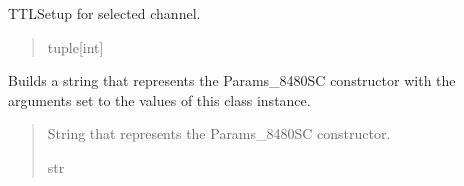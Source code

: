 \documentclass[letterpaper,10pt,english]{sphinxmanual}
\begin{document}
\begin{fulllineitems}
\begin{fulllineitems}
\begin{quote}
\begin{description}
\end{description}\end{quote}

\end{fulllineitems}


\begin{fulllineitems}
\label{\detokenize{PodApi.Parameters:PodApi.Parameters.Params8480SC.Params8480SC.ttlSetup}}
\pysigstartsignatures
{}
\pysigstopsignatures
\sphinxAtStartPar
TTL\sphinxhyphen{}Setup for selected channel.
\begin{quote}\begin{description}
\sphinxAtStartPar
tuple{[}int{]}

\end{description}\end{quote}

\end{fulllineitems}


\begin{fulllineitems}
\label{\detokenize{PodApi.Parameters:PodApi.Parameters.Params8480SC.Params8480SC.GetInit}}
\pysigstartsignatures
{}
\pysigstopsignatures
\sphinxAtStartPar
Builds a string that represents the Params\_8480SC constructor with the         arguments set to the values of this class instance.
\begin{quote}\begin{description}
\sphinxAtStartPar
String that represents the Params\_8480SC constructor.

\sphinxAtStartPar
str

\end{description}\end{quote}

\end{fulllineitems}



\end{fulllineitems}
\end{document}
